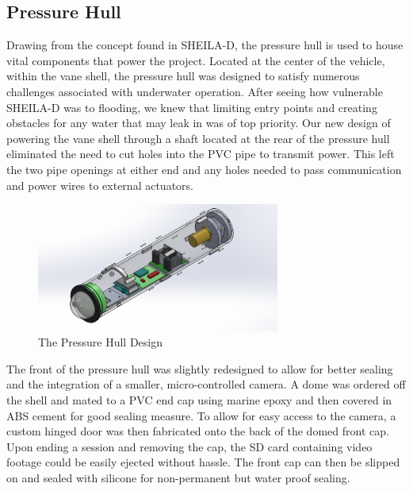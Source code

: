 \documentclass{report}
\begin{document}
\subsection{Pressure Hull}
Drawing from the concept found in SHEILA-D, the pressure hull is used to house vital components that power the project.  Located at the center of the vehicle, within the vane shell, the pressure hull was designed to satisfy numerous challenges associated with underwater operation.  After seeing how vulnerable SHEILA-D was to flooding, we knew that limiting entry points and creating obstacles for any water that may leak in was of top priority.  Our new design of powering the vane shell through a shaft located at the rear of the pressure hull eliminated the need to cut holes into the PVC pipe to transmit power.  This left the two pipe openings at either end and any holes needed to pass communication and power wires to external actuators.
\begin{figure}[h]
\centering
\includegraphics[width=8cm]{"Pressure Hull"}
\caption{The Pressure Hull Design}
\end{figure}
The front of the pressure hull was slightly redesigned to allow for better sealing and the integration of a smaller, micro-controlled camera.  A dome was ordered off the shell and mated to a PVC end cap using marine epoxy and then covered in ABS cement for good sealing measure.  To allow for easy access to the camera, a custom hinged door was then fabricated onto the back of the domed front cap.  Upon ending a session and removing the cap, the SD card containing video footage could be easily ejected without hassle.  The front cap can then be slipped on and sealed with silicone for non-permanent but water proof sealing.
\end{document}
